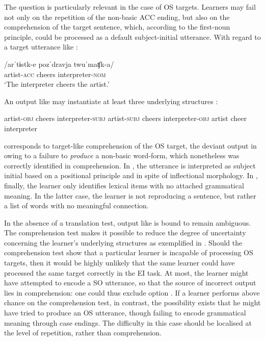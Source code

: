 The question is particularly relevant in the case of OS targets. Learners may fail not only on the repetition of the non-basic ACC ending, but also on the comprehension of the target sentence, which, according to the first-noun principle, could be processed as a default subject-initial utterance. With regard to a target utterance like : 

\ea%
    \label{ex:06:2}
    \gll    /arˈtɨstk-e  pozˈdravja  twuˈmaʧk-a/\\
            artist-\textsc{acc}  cheers    interpreter-\textsc{nom}\\
    \glt    `The interpreter cheers the artist.'
    \z

An output like  may instantiate at least three underlying structures :

\ea%
    \label{ex:06:3}
    \ea\label{ex:06:3a}
    artist-\textsc{obj}  cheers    interpreter-\textsc{subj}
    \ex\label{ex:06:3b}
    artist-\textsc{subj}  cheers    interpreter-\textsc{obj}
    \ex\label{ex:06:3c}
    artist     cheer    interpreter
    \z
\z

 corresponds to target-like comprehension of the OS target, the deviant output in  owing to a failure to \textit{produce} a non-basic word-form, which nonetheless was correctly identified in comprehension. In , the utterance is interpreted as subject initial based on a positional principle and in spite of inflectional morphology. In , finally, the learner only identifies lexical items with no attached grammatical meaning. In the latter case, the learner is not reproducing a sentence, but rather a list of words with no meaningful connection.

In the absence of a translation test, output like  is bound to remain ambiguous. The comprehension test makes it possible to reduce the degree of uncertainty concerning the learner’s underlying structures as exemplified in . Should the comprehension test show that a particular learner is incapable of processing OS targets, then it would be highly unlikely that the same learner could have processed the same target correctly in the EI task. At most, the learner might have attempted to encode a SO utterance, so that the source of incorrect output lies in comprehension: one could thus exclude option . If a learner performs above chance on the comprehension test, in contrast, the possibility exists that he might have tried to produce an OS utterance, though failing to encode grammatical meaning through case endings. The difficulty in this case should be localised at the level of repetition, rather than comprehension.

